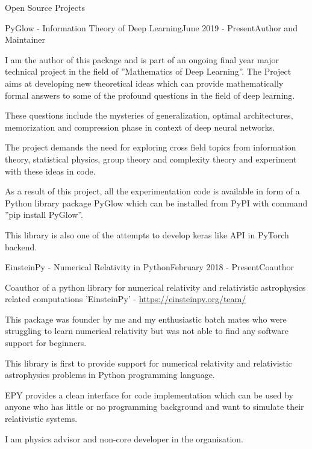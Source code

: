 \documentclass{resume} %
\begin{document}
\begin{rSection}{Open Source Projects}

\begin{rSubsection}{PyGlow - Information Theory of Deep Learning}{June 2019 - Present}{Author and Maintainer}{}
\item I am the author of this package and is part of an ongoing final year major technical project in the field of ”Mathematics of Deep Learning”. The Project aims at developing new theoretical ideas which can provide mathematically formal answers to some of the profound questions in the field of deep learning.
\item These questions include the mysteries of generalization, optimal architectures, memorization and compression phase in context of deep neural networks.
\item The project demands the need for exploring cross field topics from information theory, statistical physics, group theory and complexity theory and experiment with these ideas in code.
\item As a result of this project, all the experimentation code is available in form of a Python library package PyGlow which can be installed from PyPI with command ”pip install PyGlow”.
\item This library is also one of the attempts to develop keras like API in PyTorch backend.
\end{rSubsection}
\begin{rSubsection}{EinsteinPy - Numerical Relativity in Python}{February 2018 - Present}{Coauthor}{}
\item Coauthor of a python library for numerical relativity and relativistic astrophysics related computations 'EinsteinPy' - \url{https://einsteinpy.org/team/}
\item This package was founder by me and my enthusiastic batch mates who were struggling to learn numerical relativity but was not able to find any software support for beginners.
\item This library is first to provide support for numerical relativity and relativistic astrophysics problems in Python programming language.
\item EPY provides a clean interface for code implementation which can be used by anyone who has little or no programming background and want to simulate their relativistic systems.
\item I am physics advisor and non-core developer in the organisation.
\end{rSubsection}

\end{rSection}
\end{document}
